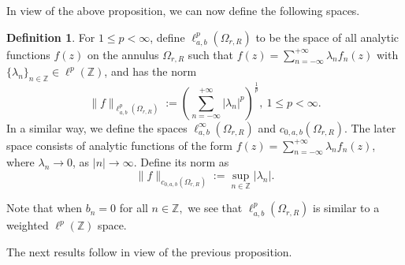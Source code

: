 \documentclass[12pt, reqno]{amsart}
\theoremstyle{definition}
\newtheorem{definition}[theorem]{Definition}
\theoremstyle{remark}
\numberwithin{equation}{section}
\begin{document}
In view of the above proposition, we can now define the following spaces.
\begin{definition}
For $1\leq p < \infty$, define $\ell^p_{a,b}(\Omega_{r,R})$ to be the space of all analytic functions $f(z)$ on the annulus $\Omega_{r,R}$ such that
$f(z)=\sum_{n=-\infty}^{+\infty}\lambda_{n}f_{n}(z)$
with $\{\lambda_n\}_{n\in\mathbb{Z}}\in \ell^p(\mathbb{Z})$, and has the norm
\begin{equation*}
    \lVert f \rVert_{\ell^p_{a,b}(\Omega_{r,R})}:=\left(\sum_{n=-\infty}^{+\infty}\lvert\lambda_{n}\rvert^{p}\right)^{\frac{1}{p}}, ~1\leq p<\infty.
\end{equation*}
In a similar way, we define the spaces $\ell^{\infty}_{a,b}(\Omega_{r,R})$ and  $c_{0,a,b}(\Omega_{r,R})$. The later space consists of analytic functions of the form $f(z)=\sum_{n=-\infty}^{+\infty} \lambda_n f_n(z)$, where $\lambda_n\rightarrow 0$, as $|n|\rightarrow \infty$. Define its norm as
\[
\|f\|_{c_{0,a,b}(\Omega_{r,R})}:=\sup_{n\in \mathbb{Z}} |\lambda_n|.
\]
\end{definition}
Note that when $b_{n}=0$ for all $n\in\mathbb{Z},$ we see that $\ell^p_{a,b}(\Omega_{r,R})$ is similar to a weighted $\ell^{p}(\mathbb{Z})$ space.  %



The next results follow in view of the previous proposition.
\end{document}
